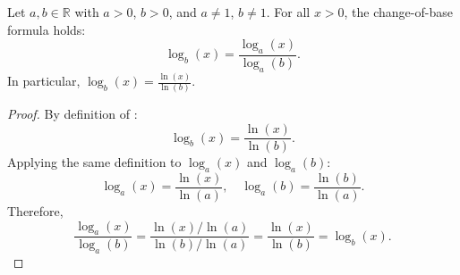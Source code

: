 \begin{lemma} \label{lemma:change_of_base_for_logarithms}
    Let $a, b \in \mathbb{R}$ with $a > 0$, $b > 0$, and $a \neq 1$, $b \neq 1$. For all $x > 0$, the change-of-base formula holds:
    $$\log_b(x) = \frac{\log_a(x)}{\log_a(b)}.$$
    In particular, $\log_b(x) = \frac{\ln(x)}{\ln(b)}$.
\end{lemma}
\begin{proof}
    By definition of :
    $$\log_b(x) = \frac{\ln(x)}{\ln(b)}.$$
    Applying the same definition to $\log_a(x)$ and $\log_a(b)$:
    $$\log_a(x) = \frac{\ln(x)}{\ln(a)}, \quad \log_a(b) = \frac{\ln(b)}{\ln(a)}.$$
    Therefore,
    $$\frac{\log_a(x)}{\log_a(b)} = \frac{\ln(x)/\ln(a)}{\ln(b)/\ln(a)} = \frac{\ln(x)}{\ln(b)} = \log_b(x).$$
\end{proof}
